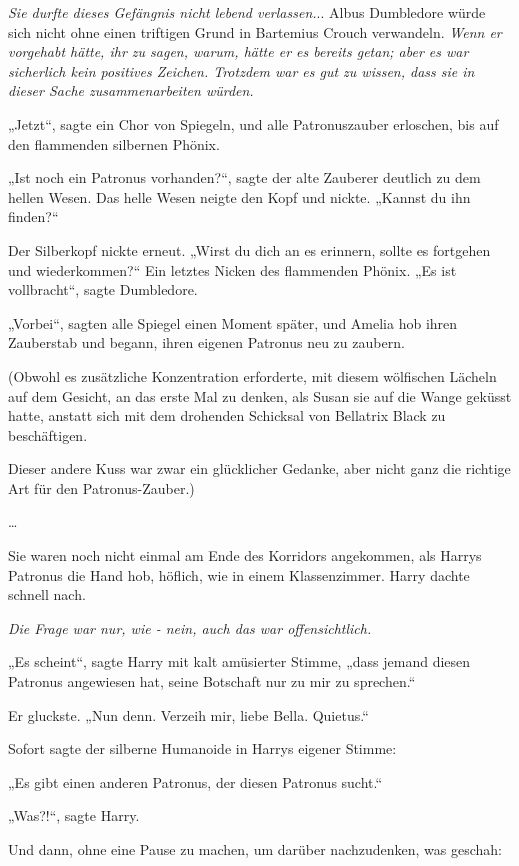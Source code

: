 {\emph{Sie durfte dieses Gefängnis nicht lebend verlassen.}.. Albus Dumbledore würde sich nicht ohne einen triftigen Grund in Bartemius Crouch verwandeln. \emph{Wenn er vorgehabt hätte, ihr zu sagen, warum, hätte er es bereits getan; aber es war sicherlich kein positives Zeichen. Trotzdem war es gut zu wissen, dass sie in dieser Sache zusammenarbeiten würden.}

„Jetzt“, sagte ein Chor von Spiegeln, und alle Patronuszauber erloschen, bis auf den flammenden silbernen Phönix.

„Ist noch ein Patronus vorhanden?“, sagte der alte Zauberer deutlich zu dem hellen Wesen. Das helle Wesen neigte den Kopf und nickte. „Kannst du ihn finden?“

Der Silberkopf nickte erneut. „Wirst du dich an es erinnern, sollte es fortgehen und wiederkommen?“ Ein letztes Nicken des flammenden Phönix. „Es ist vollbracht“, sagte Dumbledore.

„Vorbei“, sagten alle Spiegel einen Moment später, und Amelia hob ihren Zauberstab und begann, ihren eigenen Patronus neu zu zaubern.

(Obwohl es zusätzliche Konzentration erforderte, mit diesem wölfischen Lächeln auf dem Gesicht, an das erste Mal zu denken, als Susan sie auf die Wange geküsst hatte, anstatt sich mit dem drohenden Schicksal von Bellatrix Black zu beschäftigen.

Dieser andere Kuss war zwar ein glücklicher Gedanke, aber nicht ganz die richtige Art für den Patronus-Zauber.)

…

Sie waren noch nicht einmal am Ende des Korridors angekommen, als Harrys Patronus die Hand hob, höflich, wie in einem Klassenzimmer. Harry dachte schnell nach.

\emph{Die Frage war nur, wie - nein, auch das war offensichtlich.}

„Es scheint“, sagte Harry mit kalt amüsierter Stimme, „dass jemand diesen Patronus angewiesen hat, seine Botschaft nur zu mir zu sprechen.“

Er gluckste. „Nun denn. Verzeih mir, liebe Bella. Quietus.“

Sofort sagte der silberne Humanoide in Harrys eigener Stimme:

„Es gibt einen anderen Patronus, der diesen Patronus sucht.“

„Was?!“, sagte Harry.

Und dann, ohne eine Pause zu machen, um darüber nachzudenken, was geschah:

}
